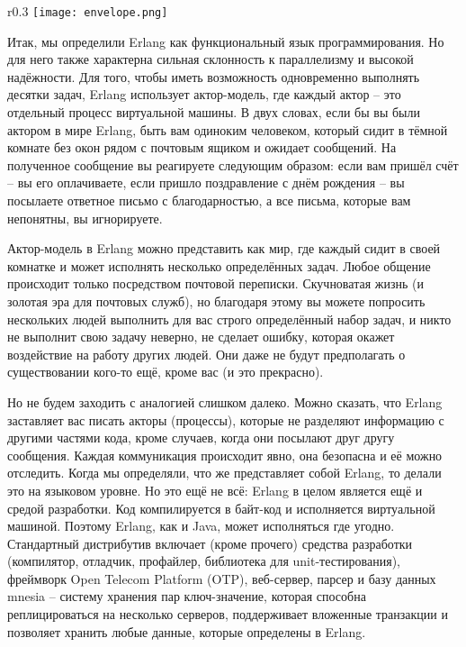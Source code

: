 \begin{wrapfigure}{r}{0.3\linewidth}
    \texttt{[image: envelope.png]}
\end{wrapfigure}
Итак, мы определили Erlang как функциональный язык программирования.
Но для него также характерна сильная склонность к параллелизму и высокой надёжности.
Для того, чтобы иметь возможность одновременно выполнять десятки задач, Erlang использует актор\--модель, где каждый актор \--- это отдельный процесс виртуальной машины.
В двух словах, если бы вы были актором в мире Erlang, быть вам одиноким человеком, который сидит в тёмной комнате без окон рядом с почтовым ящиком и ожидает сообщений.
На полученное сообщение вы реагируете следующим образом: если вам пришёл счёт \--- вы его оплачиваете, если пришло поздравление с днём рождения \--- вы посылаете ответное письмо с благодарностью, а все письма, которые вам непонятны, вы игнорируете.

Актор\--модель в Erlang можно представить как мир, где каждый сидит в своей комнатке и может исполнять несколько определённых задач.
Любое общение происходит только посредством почтовой переписки.
Скучноватая жизнь (и золотая эра для почтовых служб), но благодаря этому вы можете попросить нескольких людей выполнить для вас строго определённый набор задач, и никто не выполнит свою задачу неверно, не сделает ошибку, которая окажет воздействие на работу других людей.
Они даже не будут предполагать о существовании кого\--то ещё, кроме вас (и это прекрасно).

Но не будем заходить с аналогией слишком далеко.
Можно сказать, что Erlang заставляет вас писать акторы (процессы), которые не разделяют информацию с другими частями кода, кроме случаев, когда они посылают друг другу сообщения.
Каждая коммуникация происходит явно, она безопасна и её можно отследить.
Когда мы определяли, что же представляет собой Erlang, то делали это на языковом уровне.
Но это ещё не всё: Erlang в целом является ещё и средой разработки.
Код компилируется в байт\--код и исполняется виртуальной машиной.
Поэтому Erlang, как и Java, может исполняться где угодно.
Стандартный дистрибутив включает (кроме прочего) средства разработки (компилятор, отладчик, профайлер, библиотека для unit\--тестирования), фреймворк Open Telecom Platform (OTP), веб\--сервер, парсер и базу данных mnesia \--- систему хранения пар ключ\--значение, которая способна реплицироваться на несколько серверов, поддерживает вложенные транзакции и позволяет хранить любые данные, которые определены в Erlang.

